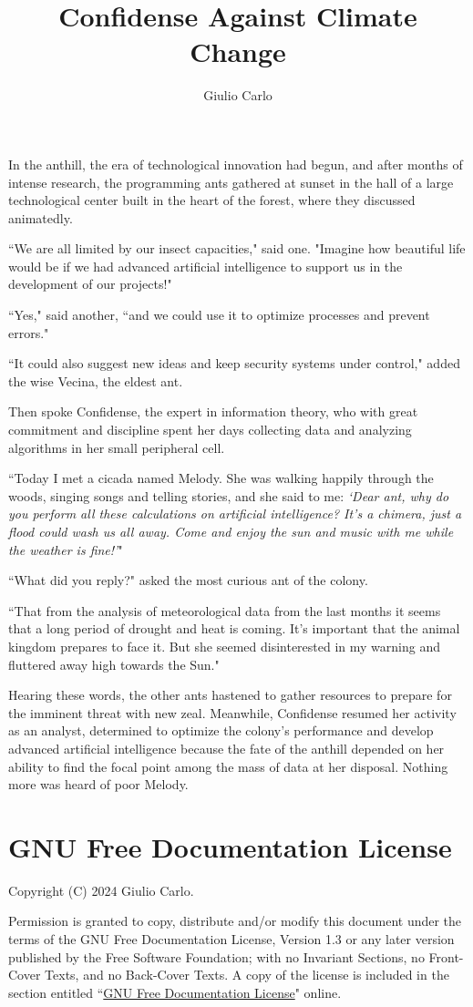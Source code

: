 \documentclass[12pt,b5paper]{article}
\author{Giulio Carlo}
\date{}
\title{Confidense Against Climate Change}
\begin{document}
\maketitle

In the anthill, the era of technological innovation had begun, and after months
of intense research, the programming ants gathered at sunset in the hall of a
large technological center built in the heart of the forest, where they
discussed animatedly.

``We are all limited by our insect capacities," said one. "Imagine how beautiful
life would be if we had advanced artificial intelligence to support us in the
development of our projects!"

``Yes," said another, ``and we could use it to optimize processes and prevent
errors."

``It could also suggest new ideas and keep security systems under control,"
added the wise Vecina, the eldest ant.

Then spoke Confidense, the expert in information theory, who with great commitment
and discipline spent her days collecting data and analyzing algorithms in her
small peripheral cell.

``Today I met a cicada named Melody. She was walking happily through the woods,
singing songs and telling stories, and she said to me: \emph{`Dear ant, why do
you perform all these calculations on artificial intelligence? It's a chimera,
just a flood could wash us all away. Come and enjoy the sun and music
with me while the weather is fine!'}"

``What did you reply?" asked the most curious ant of the colony.

``That from the analysis of meteorological data from the last months it seems
that a long period of drought and heat is coming. It's important that the
animal kingdom prepares to face it. But she seemed disinterested in my warning
and fluttered away high towards the Sun."

Hearing these words, the other ants hastened to gather resources to prepare
for the imminent threat with new zeal. Meanwhile, Confidense resumed her activity
as an analyst, determined to optimize the colony's performance and develop
advanced artificial intelligence because the fate of the anthill depended on
her ability to find the focal point among the mass of data at her disposal.
Nothing more was heard of poor Melody.

\newpage
{}
\section*{GNU Free Documentation License}
    Copyright (C)  2024 Giulio Carlo.
   
    Permission is granted to copy, distribute and/or modify this document
    under the terms of the GNU Free Documentation License, Version 1.3
    or any later version published by the Free Software Foundation;
    with no Invariant Sections, no Front-Cover Texts, and no Back-Cover Texts.
    A copy of the license is included in the section entitled ``\href{https://www.gnu.org/licenses/fdl-1.3.en.html}{GNU Free Documentation License}"
    online.
\end{document}
